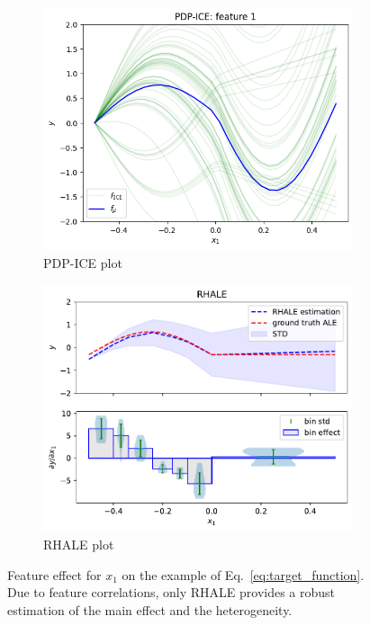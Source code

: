 \documentclass{ecai}  %
\begin{document}
\begin{figure}
    \centering
    \begin{subfigure}{.23\textwidth}
      \centering
      \includegraphics[width=1\textwidth]{concept_figure/exp_1_pdp_ice_0}
      \caption{PDP-ICE plot}
      \label{fig:concept-figure-subfig-2}
    \end{subfigure}
    \begin{subfigure}{.23\textwidth}
      \centering
      \includegraphics[width=1\textwidth]{concept_figure/exp_1_rhale_0}
      \caption{RHALE plot}
      \label{fig:concept-figure-subfig-3}
    \end{subfigure}
    \caption{Feature effect for $x_1$ on the example of Eq.~\ref{eq:target_function}. Due to feature correlations, only RHALE provides a robust estimation of the main effect and the heterogeneity.}
\label{fig:concept-figure}
\end{figure}
\end{document}
